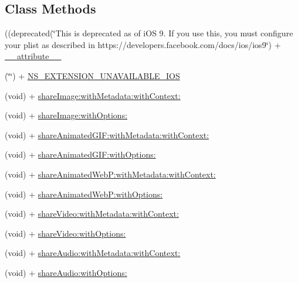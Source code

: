 \subsection*{Class Methods}
\begin{DoxyCompactItemize}
\item 
((deprecated(\char`\"{}This is deprecated as of i\+O\+S 9. If you use this, you must configure your plist as described in https\+://developers.\+facebook.\+com/docs/ios/ios9\char`\"{}) + \hyperlink{interface_f_b_s_d_k_messenger_sharer_ac7c7e5966960d21ebc4db79a017ce59e}{\+\_\+\+\_\+attribute\+\_\+\+\_\+}
\item 
(\char`\"{}\char`\"{}) + \hyperlink{interface_f_b_s_d_k_messenger_sharer_a65bc2a84f15bfa1cd2454410764ee3f3}{N\+S\+\_\+\+E\+X\+T\+E\+N\+S\+I\+O\+N\+\_\+\+U\+N\+A\+V\+A\+I\+L\+A\+B\+L\+E\+\_\+\+I\+O\+S}
\item 
(void) + \hyperlink{interface_f_b_s_d_k_messenger_sharer_a4af5604db5ffdf36755029085179cf3c}{share\+Image\+:with\+Metadata\+:with\+Context\+:}
\item 
(void) + \hyperlink{interface_f_b_s_d_k_messenger_sharer_a2e2f04f955cd3613017a49db70b5f3fc}{share\+Image\+:with\+Options\+:}
\item 
(void) + \hyperlink{interface_f_b_s_d_k_messenger_sharer_ae399428b96501fe5101442a23b2087cd}{share\+Animated\+G\+I\+F\+:with\+Metadata\+:with\+Context\+:}
\item 
(void) + \hyperlink{interface_f_b_s_d_k_messenger_sharer_ac2cc59f11486a868f2bb8d3d77f0f2d4}{share\+Animated\+G\+I\+F\+:with\+Options\+:}
\item 
(void) + \hyperlink{interface_f_b_s_d_k_messenger_sharer_a1af988a75931b6a9a9af919ba950c435}{share\+Animated\+Web\+P\+:with\+Metadata\+:with\+Context\+:}
\item 
(void) + \hyperlink{interface_f_b_s_d_k_messenger_sharer_af6e0d6c7054627f4da231ca60c4b43e5}{share\+Animated\+Web\+P\+:with\+Options\+:}
\item 
(void) + \hyperlink{interface_f_b_s_d_k_messenger_sharer_ab55e08f8701ece3d8ddae583d766b55a}{share\+Video\+:with\+Metadata\+:with\+Context\+:}
\item 
(void) + \hyperlink{interface_f_b_s_d_k_messenger_sharer_a1c41be0018fc133324f090330bcd3902}{share\+Video\+:with\+Options\+:}
\item 
(void) + \hyperlink{interface_f_b_s_d_k_messenger_sharer_a9621fb12d18851f45107b71151437715}{share\+Audio\+:with\+Metadata\+:with\+Context\+:}
\item 
(void) + \hyperlink{interface_f_b_s_d_k_messenger_sharer_ab0e0b7f8211e384ea0f67baa189a94ea}{share\+Audio\+:with\+Options\+:}
\end{DoxyCompactItemize}



